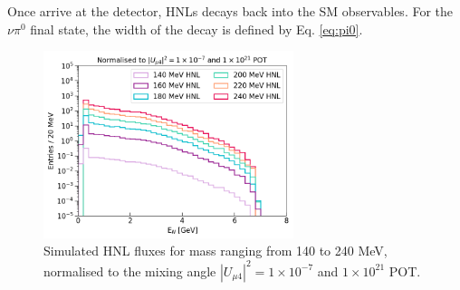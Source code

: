 Once arrive at the detector, HNLs decays back into the SM observables.
For the $\nu\pi^{0}$ final state, the width of the decay is defined by Eq. \ref{eq:pi0}.
\begin{figure}[tbp!] 
\centering    
\includegraphics[width=0.65\textwidth]{HNL_Energy_Spectrum}
\caption[HNL_Energy_Spectrum]{
Simulated HNL fluxes for mass ranging from 140 to 240 MeV, normalised to the mixing angle $|U_{\mu4}|^{2} = 1 \times 10^{-7}$ and $1 \times 10^{21}$ POT.
}
\label{fig:HNL_Energy_Spectrum}



\end{figure}
